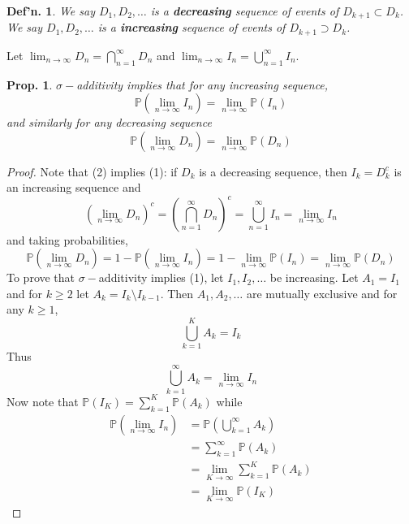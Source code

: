 \documentclass[12pt, a4paper]{book}
\renewcommand{\Pr}{\mathbb{P}}
\newtheorem{definition}[theorem]{Def'n.}
\newtheorem{proposition}[theorem]{Prop.}
\theoremstyle{nonumberplain}
\newtheorem{proof}{Proof}
\begin{document}
\begin{definition}
    We say $D_1,D_2,\ldots$ is a \textbf{decreasing} sequence of events of $D_{k+1}\subset D_k$.
    We say $D_1,D_2,\ldots$ is a \textbf{increasing} sequence of events of $D_{k+1}\supset D_k$.
\end{definition}
Let $\lim_{n\to\infty}D_n=\bigcap_{n=1}^\infty D_n$ and $\lim_{n\to\infty}I_n=\bigcup_{n=1}^\infty I_n$.
\begin{proposition}
    $\sigma-$additivity implies that for any increasing sequence,
    \[\Pr\left(\lim_{n\to\infty}I_n\right)=\lim_{n\to\infty}\Pr(I_n)\]
    and similarly for any decreasing sequence
    \[\Pr\left(\lim_{n\to\infty}D_n\right)=\lim_{n\to\infty}\Pr(D_n)\]
\end{proposition}
\begin{proof}
    Note that (2) implies (1): if $D_k$ is a decreasing sequence, then $I_k=D_k^c$ is an increasing sequence and
    \[\left(\lim_{n\to\infty}D_n\right)^c=\left(\bigcap_{n=1}^\infty D_n\right)^c=\bigcup_{n=1}^\infty I_n=\lim_{n\to\infty}I_n\]
    and taking probabilities,
    \[\Pr\left(\lim_{n\to\infty}D_n\right)=1-\Pr\left(\lim_{n\to\infty}I_n\right)=1-\lim_{n\to\infty}\Pr(I_n)=\lim_{n\to\infty}\Pr(D_n)\]
    To prove that $\sigma-$additivity implies (1), let $I_1,I_2,\ldots$ be increasing.
    Let $A_1=I_1$ and for $k\geq 2$ let $A_k=I_k\setminus I_{k-1}$.
    Then $A_1,A_2,\ldots$ are mutually exclusive and for any $k\geq 1$, 
    \[\bigcup_{k=1}^K A_k=I_k\]
    Thus
    \[\bigcup\limits_{k=1}^\infty A_k=\lim_{n\to\infty}I_n\]
    Now note that $\Pr(I_K)=\sum_{k=1}^K\Pr(A_k)$ while
    \begin{align*}
        \Pr\left(\lim_{n\to\infty}I_n\right) &= \Pr\left(\bigcup\limits_{k=1}^\infty A_k\right)\\
                                             &= \sum\limits_{k=1}^\infty \Pr(A_k)\\
                                             &= \lim_{K\to\infty}\sum\limits_{k=1}^K\Pr(A_k)\\
                                             &= \lim_{K\to\infty}\Pr(I_K)
    \end{align*}
\end{proof}
\end{document}
